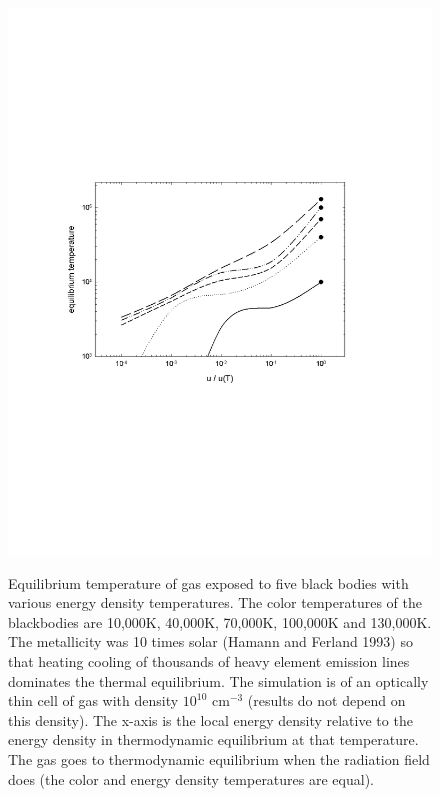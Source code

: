 \begin{figure}
\centering
\includegraphics[scale=0.9]{HighMetalsLTE}
\label{fig:HighMetalsLTE}
\caption[High metallicity gas approach to LTE]
{Equilibrium temperature of gas exposed to five black bodies with
various energy density temperatures.  The color temperatures of the
blackbodies are 10,000K, 40,000K, 70,000K, 100,000K and 130,000K.  The
metallicity was 10 times solar (Hamann and Ferland 1993) so that heating
cooling of thousands of heavy element emission lines dominates the thermal
equilibrium.  The simulation is of an optically thin cell of gas with density
$10^{10}$ cm$^{-3}$ (results do not depend on this density).  The x-axis is the local
energy density relative to the energy density in thermodynamic equilibrium
at that temperature.  The gas goes to thermodynamic equilibrium when the
radiation field does (the color and energy density temperatures are equal).}
\end{figure}

